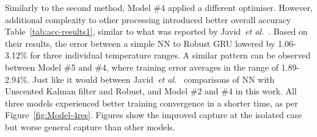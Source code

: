 %
%
Similarly to the second method, Model \#4 applied a different optimiser.
However, additional complexity to other processing introduced better overall accuracy Table~\ref{tab:acc-results1}, similar to what was reported by Javid~\textit{et al.}~\cite{javid_adaptive_2020}.
Based on their results, the error between a simple NN to Robust GRU lowered by 1.06-3.12\% for three individual temperature ranges.
A similar pattern can be observed between Model \#5 and \#4, where training error averages in the range of 1.89-2.94\%.
Just like it would between Javid~\textit{et al.}~\cite{javid_adaptive_2020} comparisons of NN with Unscented Kalman filter and Robust, and Model \#2 and \#4 in this work.
All three models experienced better training convergence in a shorter time, as per Figure~\ref{fig:Model-4res}.
Figures show the improved capture at the isolated case but worse general capture than other models.

